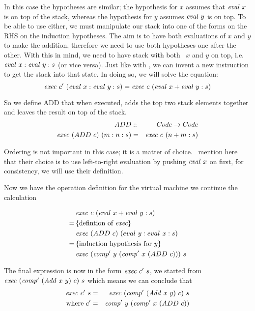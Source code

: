 \documentclass {article}
\begin{document}
In this case the hypotheses are similar;
the hypothesis for $x$ assumes that $\mathit{eval\ } x$
is on top of the stack,
whereas the hypothesis for $y$ assumes $\mathit{eval\ } y$
is on top.
To be able to use either, we must manipulate 
our stack into one of the forms on the RHS
on the induction hypotheses.
The aim is to have both evaluations of $x$ and $y$
to make the addition,
therefore we need to use both hypotheses
one after the other.
With this in mind, 
we need to have stack with both \eval\ $x$ and $y$ on top, i.e. 
 \( \mathit{eval\ } x : \mathit{eval\ } y : s \)
(or vice versa).
Just like with \val,
we can invent a new instruction
to get the stack into that state.
In doing so, we will solve the equation:
\begin{equation*}
\mathit{exec\ }  c'\ (\mathit{eval\ } x : \mathit{eval\ } y : s) 
	= \mathit{exec\ }  c\ (\mathit{eval\ } x + \mathit{eval\ } y :s)
\end{equation*}

\newcommand{\ADD}{ADD\ }

So we define ADD that
when executed, adds the top two stack elements
together and leaves the result on top of the stack.
\begin{eqnarray}
ADD &::& Code \rightarrow Code \nonumber \\
\Exec (\ADD c)\ (m:n:s) &=& \Exec c\ (n+m:s)
\end{eqnarray}

Ordering is not important in this case; it is a matter of choice.
\BH\ mention here that their choice is to use
left-to-right evaluation by pushing $\mathit{eval\ } x$ on first,
for consistency, we will use their definition.

Now we have the operation definition for the 
virtual machine we continue the calculation 

\begin{align*}
&\Exec c\ (\evalf x + \evalf y :s) \\
=\, & \{ \mbox{defintion of}\ \exec\} \\
&\Exec (\ADD c)\ (eval\ y : eval\ x : s) \\
=\, & \{ \mbox{induction hypothesis for}\  y \} \\
&\Exec (\Compp y\ (\Compp x\ (\ADD c)))\ s
\end{align*}

The final expression is now in the form
\( \mathit{exec\ } c'\ s \), we started from
\( \mathit{exec\ } (\mathit{comp'\ }  (\mathit{Add\ } x\ y)\ c)\ s \)
which means we can conclude that 
\begin{eqnarray*}
\Exec c'\ s &=& \Exec (\Compp  (\Add x\ y)\ c)\ s \\
\mbox{where}\ c' &=& \Compp y\ (\Compp x\ (\ADD c))
\end{eqnarray*}
\end{document}
